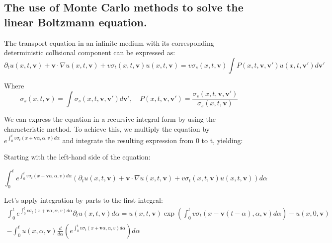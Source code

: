 \documentclass[a4paper,12pt]{article}
\begin{document}
	
	\subsection{The use of Monte Carlo methods to solve the linear Boltzmann equation.}
	\textbf The transport equation in an infinite medium with its corresponding deterministic collisional component can be expressed as:
	\begin{equation}
		\partial _t u(x,t,\textbf{v}) + \textbf{v} \cdot \nabla u(x,t,\textbf{v}) + v\sigma_t (x,t,\textbf{v})u(x,t,\textbf{v})= v\sigma_s(x,t,\textbf{v})\int P (x,t,\textbf{v},\textbf{v}')u(x,t,\textbf{v}')d\textbf{v}'
	\end{equation}
	
	Where 
	\begin{equation*}
		\sigma_s (x,t,\textbf{v})= \int \sigma_s (x,t,\textbf{v},\textbf{v}')d\textbf{v}', \quad  P (x,t,\textbf{v},\textbf{v}')=
		\frac{\sigma_s (x,t,\textbf{v},\textbf{v}')}{\sigma_s (x,t,\textbf{v})}
	\end{equation*}
	
	
	
	
	We can express the equation in a recursive integral form by using the characteristic method. To achieve this, we multiply the equation by $e^{\int _0^t v \sigma_t (x + \textbf{v}\alpha,\alpha, v) d \alpha}$ and integrate the resulting expression from 0 to t, yielding:
	
	Starting with the left-hand side of the equation:
	
	\begin{equation*}
		\int_0^t e^{\int _0^t v\sigma_t (x + \textbf{v}\alpha,\alpha, v) d\alpha} \left(\partial _t u(x,t,\textbf{v}) + \textbf{v} \cdot \nabla u(x,t,\textbf{v}) + v\sigma_t (x,t,\textbf{v})u(x,t,\textbf{v})\right) d\alpha 
	\end{equation*}
	
	
	Let's apply integration by parts to the first integral:
	\begin{multline*}
		\int_0^t e^{\int _0^t v\sigma_t (x + \textbf{v}\alpha,\alpha, v) d\alpha} \partial _t u(x,t,\textbf{v}) d\alpha = u(x, t, \textbf{v}) \exp\left( \int_{0}^{t} v\sigma_t\left(x - \textbf{v}(t - \alpha), \alpha, \textbf{v}\right) d\alpha\right) - u(x, 0, \textbf{v})\\
		- \int_0^t u(x, \alpha, \textbf{v}) \frac{d}{d\alpha} \left(e^{\int _0^t v\sigma_t (x + \textbf{v}\alpha, \alpha, v) d\alpha}\right) d\alpha
	\end{multline*}
	
\end{document}
